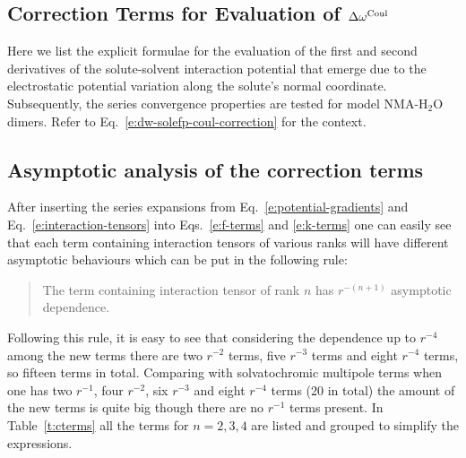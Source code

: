 \documentclass[a4paper,titlepage,twoside,fleqn,12pt]{book}
\begin{document}
\begin{appendices}
\chapter{Correction Terms for Evaluation of $\Delta \omega^{\rm Coul}$\label{a:fk-terms}}

Here we list the explicit formulae for the evaluation of the first and second derivatives
of the solute\hyp{}solvent interaction potential that emerge due to the electrostatic potential
variation along the solute's normal coordinate. Subsequently, the series 
convergence properties are tested for model NMA-H$_2$O dimers. 
Refer to Eq.~\eqref{e:dw-solefp-coul-correction}
for the context.

\section{Asymptotic analysis of the correction terms}

After inserting the series expansions from Eq.~\eqref{e:potential-gradients} 
and Eq.~\eqref{e:interaction-tensors} into Eqs.~\eqref{e:f-terms} and \eqref{e:k-terms}
one can easily see that each term containing interaction tensors of various ranks
will have different asymptotic behaviours which can be put in 
the following rule:
%
\begin{quote}
The term containing interaction tensor of rank $n$ 
has $r^{-(n+1)}$ asymptotic dependence.
\end{quote}
%
Following this rule,
it is easy to see that considering the dependence up to $r^{-4}$ among the new terms
there are two $r^{-2}$ terms, five $r^{-3}$ terms and eight
$r^{-4}$ terms, so fifteen terms in total. Comparing with 
solvatochromic multipole terms when one has two $r^{-1}$,
four $r^{-2}$, six $r^{-3}$ and eight $r^{-4}$ terms (20 in total)
the amount of the new terms is quite big though there are no $r^{-1}$ 
terms present. In Table~\ref{t:cterms} all the terms for $n=2,3,4$
are listed and grouped to simplify the expressions.


\end{appendices}
\end{document}
